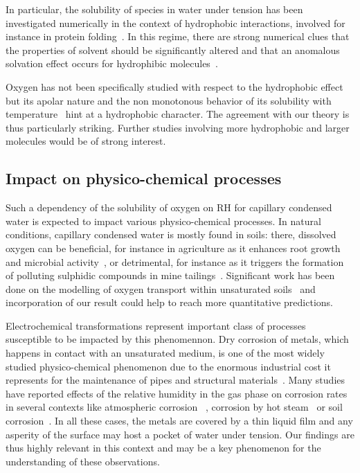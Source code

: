 \documentclass[aps,prl,twocolumn,superscriptaddress,groupedaddress]{revtex4}
\begin{document}
In particular, the solubility of species in water under tension has been investigated numerically in the context of hydrophobic interactions, involved for instance in protein folding~\cite{chen_2017b}. In this regime, there are strong numerical clues that the properties of solvent should be significantly altered and that an anomalous solvation effect occurs for hydrophibic molecules~\cite{rajamani_2005}. 

Oxygen has not been specifically studied with respect to the hydrophobic effect but its apolar nature and the non monotonous behavior of its solubility with temperature~\cite{battino_1966,clever_2014} hint at a hydrophobic character. The agreement with our theory is thus particularly striking. Further studies involving more hydrophobic and larger molecules would be of strong interest. 

\subsection{Impact on physico-chemical processes}

Such a dependency of the solubility of oxygen on $\mathrm{RH}$ for capillary condensed water is expected to impact various physico-chemical processes. In natural conditions, capillary condensed water is mostly found in soils: there, dissolved oxygen can be beneficial, for instance in agriculture as it enhances root growth~\cite{geisler_1967,nobel_1989} and microbial activity~\cite{molz_1986}, or detrimental, for instance as it triggers the formation of polluting sulphidic compounds in mine tailings~\cite{yanful_1993}. Significant work has been done on the modelling of oxygen transport within unsaturated soils~\cite{chesnaux_2009} and incorporation of our result could help to reach more quantitative predictions.

Electrochemical transformations represent important class of processes susceptible to be impacted by this phenomennon. Dry corrosion of metals, which happens in contact with an unsaturated medium, is one of the most widely studied physico-chemical phenomenon due to the enormous industrial cost it represents for the maintenance of pipes and structural materials~\cite{corrosion_report}. Many studies have reported effects of the relative humidity in the gas phase on corrosion rates in several contexts like atmospheric corrosion ~\cite{vernon_1931,mansfeld_1976,stratmann_1990a,stratmann_1990b,tsuru_1995}, corrosion by hot steam~\cite{deal_1963} or soil corrosion~\cite{gupta_1979,gardiner_2002}. In all these cases, the metals are covered by a thin liquid film and any asperity of the surface may host a pocket of water under tension. Our findings are thus highly relevant in this context and may be a key phenomenon for the understanding of these observations.
\end{document}
